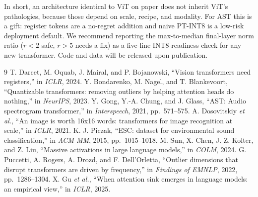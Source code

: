 \documentclass{Interspeech2024}
\begin{document}
In short, an architecture identical to ViT on paper does not inherit ViT's pathologies, because those depend on scale, recipe, and modality. For AST this is a gift: register tokens are a no-regret addition and naive PT-INT8 is a low-risk deployment default. We recommend reporting the max-to-median final-layer norm ratio ($r{<}2$ safe, $r{>}5$ needs a fix) as a five-line INT8-readiness check for any new transformer. Code and data will be released upon publication.


\begin{thebibliography}{9}
 T. Darcet, M. Oquab, J. Mairal, and P. Bojanowski, ``Vision transformers need registers,'' in \emph{ICLR}, 2024.
 Y. Bondarenko, M. Nagel, and T. Blankevoort, ``Quantizable transformers: removing outliers by helping attention heads do nothing,'' in \emph{NeurIPS}, 2023.
 Y. Gong, Y.-A. Chung, and J. Glass, ``AST: Audio spectrogram transformer,'' in \emph{Interspeech}, 2021, pp.\ 571--575.
 A. Dosovitskiy \emph{et al.}, ``An image is worth 16x16 words: transformers for image recognition at scale,'' in \emph{ICLR}, 2021.
 K. J. Piczak, ``ESC: dataset for environmental sound classification,'' in \emph{ACM MM}, 2015, pp.\ 1015--1018.
 M. Sun, X. Chen, J. Z. Kolter, and Z. Liu, ``Massive activations in large language models,'' in \emph{COLM}, 2024.
 G. Puccetti, A. Rogers, A. Drozd, and F. Dell'Orletta, ``Outlier dimensions that disrupt transformers are driven by frequency,'' in \emph{Findings of EMNLP}, 2022, pp.\ 1286--1304.
 X. Gu \emph{et al.}, ``When attention sink emerges in language models: an empirical view,'' in \emph{ICLR}, 2025.
\end{thebibliography}
\end{document}
